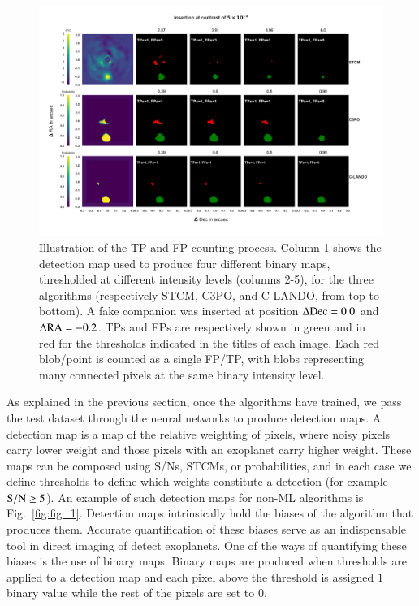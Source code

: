 \documentclass{aa}
\begin{document}
\begin{figure}[t]
    \includegraphics[width=\textwidth]{Fig3_Sep2023.png}
    \caption{Illustration of the TP and FP counting process. Column 1 shows the detection map used to produce four different binary maps, thresholded at different intensity levels (columns 2-5), for the three algorithms (respectively STCM, C3PO, and C-LANDO, from top to bottom). A fake companion was inserted at position $\Delta{\rm Dec}=0.0$ and $\Delta{\rm RA} = -0.2$. TPs and FPs are respectively shown in green and in red for the thresholds indicated in the titles of each image. Each red blob/point is counted as a single FP/TP, with blobs representing many connected pixels at the same binary intensity level.}
    \label{fig:sample_detmaps}
\end{figure}

As explained in the previous section, once the algorithms have trained, we pass the test dataset through the neural networks to produce detection maps.
A detection map is a map of the relative weighting of pixels, where noisy pixels carry lower weight and those pixels with an exoplanet carry higher weight.
These maps can be composed using S/Ns, STCMs, or probabilities, and in each case we define thresholds to define which weights constitute a detection (for example $\rm{S/N}\ge 5$).
An example of such detection maps for non-ML algorithms is Fig.~\ref{fig:fig_1}.
Detection maps intrinsically hold the biases of the algorithm that produces them. Accurate quantification of these biases serve as an indispensable tool in direct imaging of detect exoplanets.
One of the ways of quantifying these biases is the use of  binary maps.
Binary maps are produced when thresholds are applied to a detection map and each pixel above the threshold is assigned $1$ binary value while the rest of the pixels are set to $0$.
\end{document}
